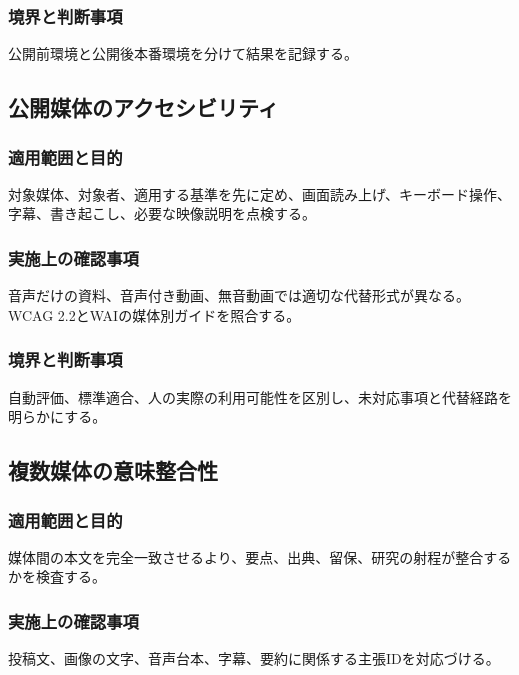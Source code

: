 \documentclass[a4paper,11pt]{article}
\begin{document}
\subsubsection{境界と判断事項}
\par 公開前環境と公開後本番環境を分けて結果を記録する。\par\medskip
\subsection{公開媒体のアクセシビリティ}
\subsubsection{適用範囲と目的}
\par 対象媒体、対象者、適用する基準を先に定め、画面読み上げ、キーボード操作、字幕、書き起こし、必要な映像説明を点検する。\par\medskip
\subsubsection{実施上の確認事項}
\par 音声だけの資料、音声付き動画、無音動画では適切な代替形式が異なる。WCAG 2.2とWAIの媒体別ガイドを照合する。\par\medskip
\subsubsection{境界と判断事項}
\par 自動評価、標準適合、人の実際の利用可能性を区別し、未対応事項と代替経路を明らかにする。\par\medskip
\subsection{複数媒体の意味整合性}
\subsubsection{適用範囲と目的}
\par 媒体間の本文を完全一致させるより、要点、出典、留保、研究の射程が整合するかを検査する。\par\medskip
\subsubsection{実施上の確認事項}
\par 投稿文、画像の文字、音声台本、字幕、要約に関係する主張IDを対応づける。\par\medskip
\end{document}
